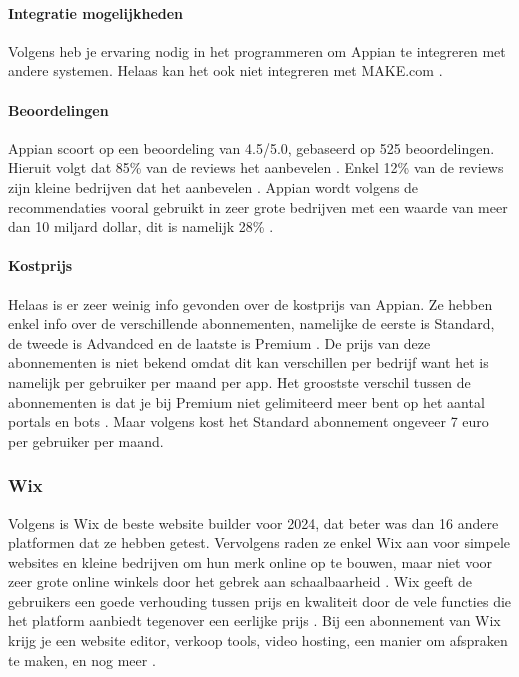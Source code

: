 \paragraph{Integratie mogelijkheden}
Volgens \textcite{Marvin2017} heb je ervaring nodig in het programmeren om Appian te integreren met andere systemen. 
Helaas kan het ook niet integreren met MAKE.com \autocite{MAKE.com2024a}.

\paragraph{Beoordelingen}
Appian scoort op \textcite{Gartner2024} een beoordeling van 4.5/5.0, gebaseerd op 525 beoordelingen. Hieruit volgt dat 85\% van de reviews het aanbevelen \autocite{Gartner2024}.
Enkel 12\% van de reviews zijn kleine bedrijven dat het aanbevelen \autocite{Gartner2024}. Appian wordt volgens de recommendaties vooral gebruikt in zeer grote bedrijven met een waarde van meer dan 10 miljard dollar, dit is namelijk 28\% \autocite{Gartner2024}.
\paragraph{Kostprijs}
Helaas is er zeer weinig info gevonden over de kostprijs van Appian. Ze hebben enkel info over de verschillende abonnementen, namelijke de eerste is 
Standard, de tweede is Advandced en de laatste is Premium \autocite{Appian2024}. De prijs van deze abonnementen is niet bekend omdat dit kan verschillen per bedrijf want het is namelijk 
per gebruiker per maand per app. Het groostste verschil tussen de abonnementen is dat je bij Premium niet gelimiteerd meer bent op het aantal portals en bots \autocite{Appian2024}. Maar volgens
\textcite{Shala} kost het Standard abonnement ongeveer 7 euro per gebruiker per maand.


\subsubsection*{Wix}
Volgens \textcite{Ryan2024} is Wix de beste website builder voor 2024, dat beter was dan 16 andere platformen dat ze hebben getest. Vervolgens raden ze enkel 
Wix aan voor simpele websites en kleine bedrijven om hun merk online op te bouwen, maar niet voor zeer grote online winkels door het gebrek aan schaalbaarheid \autocite{Ryan2024}.
Wix geeft de gebruikers een goede verhouding tussen prijs en kwaliteit door de vele functies die het platform aanbiedt tegenover een eerlijke prijs  \autocite{Singleton2024}.
Bij een abonnement van Wix krijg je een website editor, verkoop tools, video hosting, een manier om afspraken te maken, en nog meer \autocite{Singleton2024}.
